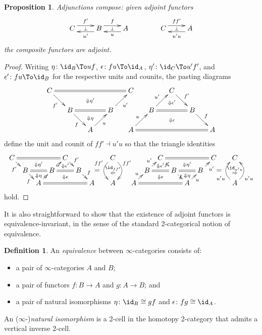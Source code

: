 \documentclass[12pt,reqno]{amsart}
\theoremstyle{plain}
\newtheorem{prop}[thm]{Proposition}
\theoremstyle{definition}
\newtheorem{defn}[thm]{Definition}
\theoremstyle{remark}
\numberwithin{equation}{subsection}
\begin{document}
\begin{prop}\label{prop:adjunctions-compose} Adjunctions compose: given adjoint functors
\[ \vcenter{\xymatrix{ C \ar@<1ex>[r]^{f'} \ar@{}[r]|\perp & B \ar@<1ex>[r]^f \ar@<1ex>[l]^{u'} \ar@{}[r]|\perp & A  \ar@<1ex>[l]^u}} \qquad \rightsquigarrow\qquad  \vcenter{\xymatrix{ C \ar@<1ex>[r]^{ff'} \ar@{}[r]|\perp & A \ar@<1ex>[l]^{u'u}}}\] the composite functors are adjoint.
\end{prop}
\begin{proof}
Writing $\eta \colon \id_B \To uf$, $\epsilon \colon fu \To \id_A$, $\eta' \colon \id_C \To u'f'$, and $\epsilon' \colon fu \To \id_B$ for the respective units and counits, the pasting diagrams 
\[ \xymatrix@=1.5em{  C \ar[dr]_{f'} \ar@{=}[rrrr] & & \ar@{}[d]|{\Downarrow \eta'} & & C & & C \ar@{}[d]|(.6){\Downarrow\epsilon'} \ar[dr]^{f'} \\ & B \ar@{=}[rr] \ar[dr]_f & \ar@{}[d]|(.4){\Downarrow\eta} & B \ar[ur]_{u'} & & B \ar[ur]^{u'} \ar@{=}[rr] & \ar@{}[d]|{\Downarrow\epsilon} & B \ar[dr]^f \\ & & A \ar[ur]_u & & A \ar[ur]^u \ar@{=}[rrrr] & & & & A}\] define the unit and counit of $ff' \dashv u'u$ so that the triangle identities
\[ \xymatrix@=.50em{  C \ar[dr]_{f'} \ar@{=}[rrrr] & & \ar@{}[d]|{\Downarrow \eta'} & & C  \ar@{}[d]|(.6){\Downarrow\epsilon'} \ar[dr]^{f'}& & && C   \ar@/^3ex/[dd]^(.3){ff'} \ar@/_3ex/[dd]_(.3){ff'} \ar@{}[dd]|(.4){\id_{ff'}}|(.6){\Leftarrow} &   &&  & C \ar@{}[d]|(.6){\Downarrow\epsilon'} \ar[dr]|{f'} \ar@{=}[rrrr] & & \ar@{}[d]|{\Downarrow \eta'} & & C & & C  \\ & B \ar@{=}[rr] \ar[dr]_f & \ar@{}[d]|(.4){\Downarrow\eta} & B \ar[ur]|{u'}  \ar@{=}[rr] & \ar@{}[d]|{\Downarrow\epsilon} & B \ar[dr]^f & & \ar@{}[l]|{\displaystyle =} & &&   & B \ar[ur]^{u'} \ar@{=}[rr] & \ar@{}[d]|{\Downarrow\epsilon} & B \ar[dr]|f   \ar@{=}[rr] & \ar@{}[d]|(.4){\Downarrow\eta} & B \ar[ur]_{u'} & & \ar@{}[l]|{\displaystyle =}  \\ & & A \ar[ur]|u  \ar@{=}[rrrr] & & & & A & &  A & &   A \ar[ur]^u \ar@{=}[rrrr] & & & & A \ar[ur]_u & & & &  A \ar@/^3ex/[uu]^(.3){u'u} \ar@/_3ex/[uu]_(.3){u'u} \ar@{}[uu]|(.6){\id_{u'u}}|(.4){\Rightarrow} & &  } \] 
hold.
\end{proof}

It is also straightforward to show that the existence of adjoint functors is equivalence-invariant, in the sense of the standard 2-categorical notion of equivalence.

\begin{defn}\label{defn:equivalence} An \emph{equivalence} between $\infty$-categories consists of:
\begin{itemize}
\item a pair of $\infty$-categories $A$ and $B$;
\item a pair of functors $f \colon B \to A$ and $g \colon A \to B$; and
\item a pair of natural isomorphisms  $\eta \colon \id_B \cong gf$ and $\epsilon \colon fg \cong \id_A$.
\end{itemize}
An ($\infty$-)\emph{natural isomorphism} is a 2-cell in the homotopy 2-category that admits a vertical inverse 2-cell.
\end{defn}
\end{document}

